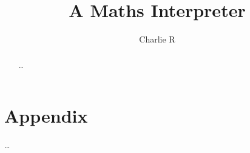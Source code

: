 \documentclass[titlepage]{report}
\title{\textbf{\huge{A Maths Interpreter}}\\ \ccbyncsa}
\author{Charlie R}
\begin{document}
    \maketitle


    \tableofcontents

    \begin{abstract}
        \ldots
    \end{abstract}

    \newpage{}\setcounter{page}{1}

    
    
    

    \newpage{}\setcounter{page}{1}
    
    \printbibliography

    \chapter{Appendix}
        \ldots
\end{document}
